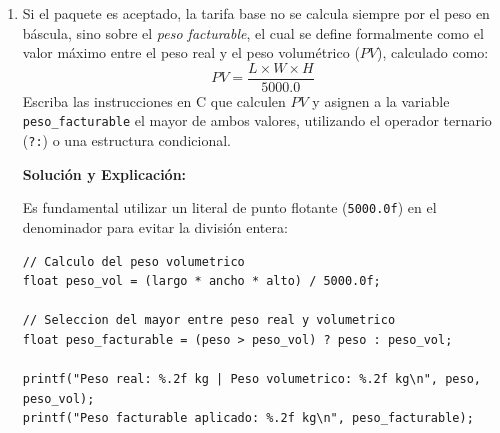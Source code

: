 \documentclass[11pt,letterpaper]{article}
\begin{document}
\begin{enumerate}[label=\textbf{\arabic*.}]
\begin{enumerate}[label=(\alph*)]
        \begin{solucionbox}
        \textbf{Solución y Explicación:}
        
        \noindent Se unen las condiciones de rechazo mediante el operador lógico disyunción (\texttt{||}):
        \begin{lstlisting}[style=customc]
// Evaluacion de condiciones de admision
if (peso > 30.0f || largo > 120.0f || ancho > 120.0f || alto > 120.0f || (largo + ancho + alto) > 250.0f) {
    printf("Paquete rechazado: excede los limites permitidos de peso o tamano.\n");
} else {
    printf("Paquete aceptado para distribucion.\n");
}
        \end{lstlisting}
        \end{solucionbox}

        \vspace{0.3cm}
        \item Si el paquete es aceptado, la tarifa base no se calcula siempre por el peso en báscula, sino sobre el \textit{peso facturable}, el cual se define formalmente como el valor máximo entre el peso real y el peso volumétrico ($PV$), calculado como:
        \[
        PV = \frac{L \times W \times H}{5000.0}
        \]
        Escriba las instrucciones en C que calculen $PV$ y asignen a la variable \texttt{peso\_facturable} el mayor de ambos valores, utilizando el operador ternario (\texttt{?:}) o una estructura condicional.

        \begin{solucionbox}
        \textbf{Solución y Explicación:}
        
        \noindent Es fundamental utilizar un literal de punto flotante (\texttt{5000.0f}) en el denominador para evitar la división entera:
        \begin{lstlisting}[style=customc]
// Calculo del peso volumetrico
float peso_vol = (largo * ancho * alto) / 5000.0f;

// Seleccion del mayor entre peso real y volumetrico
float peso_facturable = (peso > peso_vol) ? peso : peso_vol;

printf("Peso real: %.2f kg | Peso volumetrico: %.2f kg\n", peso, peso_vol);
printf("Peso facturable aplicado: %.2f kg\n", peso_facturable);
        \end{lstlisting}
        \end{solucionbox}
    \end{enumerate}


\end{enumerate}
\end{document}
